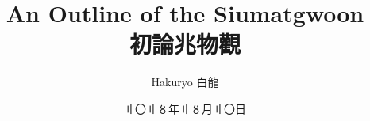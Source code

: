 \documentclass[9pt]{article}
\title{An Outline of the Siumatgwoon \\ 初論兆物觀}
\author{Hakuryo 白龍}
\date{〢〇〢〥年〢〥月〢〇日}
\begin{document}
\sloppy

\jcz{}


\maketitle




% 
% 
\end{document}
